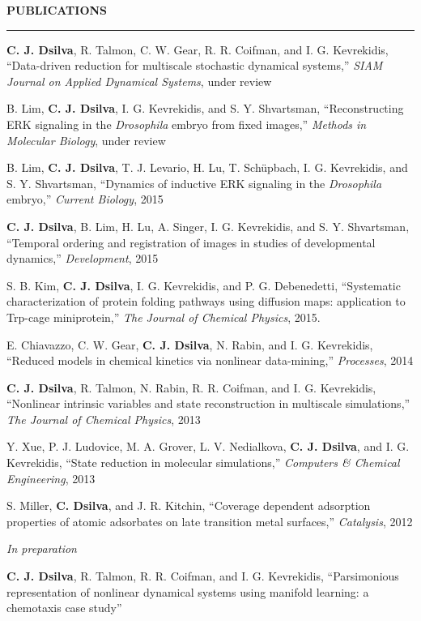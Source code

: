 \documentclass[letterpaper,10pt]{article}
\newenvironment{itemize*}
  {\begin{itemize}
    \setlength{\parskip}{-2pt}}
  {\end{itemize}}
\newcommand{\cvheading}[1]{
\vspace{0.11in}
\noindent
\MakeUppercase{\bf #1}
\vspace{0.06in}
{\hrule height 0.3mm}
\vspace{0.06in}}
\begin{document}
\cvheading{Publications}
\begin{itemize*}
\item {\bf C. J. Dsilva}, R. Talmon, C. W. Gear, R. R. Coifman, and I. G. Kevrekidis, ``Data-driven reduction for multiscale stochastic dynamical systems,'' {\em SIAM Journal on Applied Dynamical Systems}, under review
\item B. Lim, {\bf C. J. Dsilva}, I. G. Kevrekidis, and S. Y. Shvartsman, ``Reconstructing ERK signaling in the {\em Drosophila} embryo from fixed images,'' {\em Methods in Molecular Biology}, under review
\item B. Lim, {\bf C. J. Dsilva}, T. J. Levario, H. Lu, T. Sch\"{u}pbach, I. G. Kevrekidis, and S. Y. Shvartsman, ``Dynamics of inductive ERK signaling in the {\em Drosophila} embryo,'' {\em Current Biology}, 2015
\item {\bf C. J. Dsilva}, B. Lim, H. Lu, A. Singer, I. G. Kevrekidis, and S. Y. Shvartsman, ``Temporal ordering and registration of images in studies of developmental dynamics,'' {\em Development}, 2015
\item S. B. Kim, {\bf C. J. Dsilva}, I. G. Kevrekidis, and P. G. Debenedetti, ``Systematic characterization of protein folding pathways using diffusion maps: application to Trp-cage miniprotein,'' {\em The Journal of Chemical Physics}, 2015. 
\item E. Chiavazzo, C. W. Gear, {\bf C. J. Dsilva}, N. Rabin, and I. G. Kevrekidis, ``Reduced models in chemical kinetics via nonlinear data-mining,'' {\em Processes}, 2014
\item {\bf C. J. Dsilva}, R. Talmon, N. Rabin, R. R. Coifman, and I. G. Kevrekidis, ``Nonlinear intrinsic variables and state reconstruction in multiscale simulations,''
{\em The Journal of Chemical Physics}, 2013
\item Y. Xue, P. J. Ludovice, M. A. Grover, L. V. Nedialkova, {\bf C. J. Dsilva}, and I. G. Kevrekidis, ``State reduction in molecular simulations,'' {\em Computers \& Chemical Engineering}, 2013
\item S. Miller, {\bf C. Dsilva}, and J. R. Kitchin, ``Coverage dependent adsorption properties of atomic adsorbates on late transition metal surfaces,'' {\em Catalysis},  2012
\end{itemize*}

{\em In preparation}

\begin{itemize*}
\item {\bf C. J. Dsilva}, R. Talmon, R. R. Coifman, and I. G. Kevrekidis, ``Parsimonious representation of nonlinear dynamical systems using manifold learning: a chemotaxis case study''
\end{itemize*}
\end{document}
